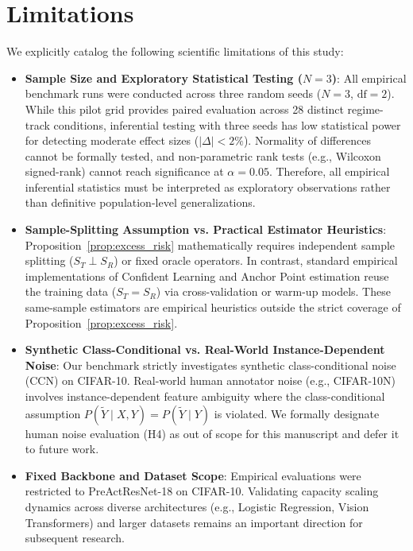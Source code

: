 \documentclass[journal]{IEEEtran}
\theoremstyle{definition}
\begin{document}
\section{Limitations}
We explicitly catalog the following scientific limitations of this study:
\begin{itemize}
    \item \textbf{Sample Size and Exploratory Statistical Testing ($N=3$)}: All empirical benchmark runs were conducted across three random seeds ($N=3$, $\text{df}=2$). While this pilot grid provides paired evaluation across 28 distinct regime-track conditions, inferential testing with three seeds has low statistical power for detecting moderate effect sizes ($|\Delta| < 2\%$). Normality of differences cannot be formally tested, and non-parametric rank tests (e.g., Wilcoxon signed-rank) cannot reach significance at $\alpha=0.05$. Therefore, all empirical inferential statistics must be interpreted as exploratory observations rather than definitive population-level generalizations.
    \item \textbf{Sample-Splitting Assumption vs. Practical Estimator Heuristics}: Proposition~\ref{prop:excess_risk} mathematically requires independent sample splitting ($S_T \perp S_R$) or fixed oracle operators. In contrast, standard empirical implementations of Confident Learning and Anchor Point estimation reuse the training data ($S_T = S_R$) via cross-validation or warm-up models. These same-sample estimators are empirical heuristics outside the strict coverage of Proposition~\ref{prop:excess_risk}.
    \item \textbf{Synthetic Class-Conditional vs. Real-World Instance-Dependent Noise}: Our benchmark strictly investigates synthetic class-conditional noise (CCN) on CIFAR-10. Real-world human annotator noise (e.g., CIFAR-10N) involves instance-dependent feature ambiguity where the class-conditional assumption $P(\tilde{Y} \mid X, Y) = P(\tilde{Y} \mid Y)$ is violated. We formally designate human noise evaluation (H4) as out of scope for this manuscript and defer it to future work.
    \item \textbf{Fixed Backbone and Dataset Scope}: Empirical evaluations were restricted to PreActResNet-18 on CIFAR-10. Validating capacity scaling dynamics across diverse architectures (e.g., Logistic Regression, Vision Transformers) and larger datasets remains an important direction for subsequent research.
\end{itemize}
\end{document}
